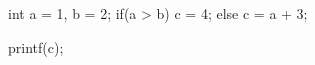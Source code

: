 \begin{minipage}[t]{2.5in}
\begin{AVerb}[numbers=left]
int a = 1, b = 2; \label{lst_back1_assign}
if(a > b) \label{lst_back1_test}
  c = 4; \label{lst_back1_test_true}
else     
  c = a + 3; \label{lst_back1_test_false}

printf(c); \label{lst_back1_print}
\end{AVerb}
\end{minipage}
